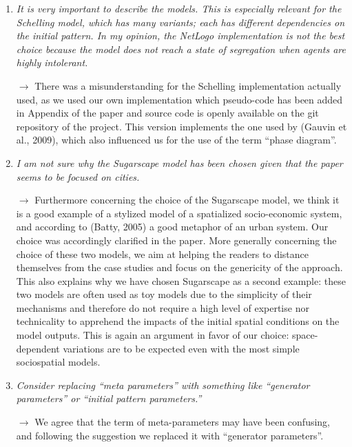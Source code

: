 \documentclass[11pt,a4paper,sans]{moderncv}        %
\begin{document}
\begin{enumerate}
	\item \textit{It is very important to describe the models. This is especially relevant for the Schelling model, which has many variants; each has different dependencies on the initial pattern. In my opinion, the NetLogo implementation is not the best choice because the model does not reach a state of segregation when agents are highly intolerant.}
	
	\medskip
	
	$\rightarrow$ There was a misunderstanding for the Schelling implementation actually used, as we used our own implementation which pseudo-code has been added in Appendix of the paper and source code is openly available on the git repository of the project. This version implements the one used by (Gauvin et al., 2009), which also influenced us for the use of the term ``phase diagram''.

	\bigskip
	
	
	\item \textit{I am not sure why the Sugarscape model has been chosen given that the paper seems to be focused on cities.}
	
	\medskip
	
	$\rightarrow$ Furthermore concerning the choice of the Sugarscape model, we think it is a good example of a stylized model of a spatialized socio-economic system, and according to (Batty, 2005) a good metaphor of an urban system. Our choice was accordingly clarified in the paper. More generally concerning the choice of these two models, we aim at helping the readers to distance themselves from the case studies and focus on the genericity of the approach. This also explains why we have chosen Sugarscape as a second example: these two models are often used as toy models due to the simplicity of their mechanisms and therefore do not require a high level of expertise nor technicality to apprehend the impacts of the initial spatial conditions on the model outputs. This is again an argument in favor of our choice: space-dependent variations are to be expected even with the most simple sociospatial models.
	\bigskip
	
	\item \textit{Consider replacing “meta parameters” with something like “generator parameters” or “initial pattern parameters.”}
	
	\medskip
	
	$\rightarrow$ We agree that the term of meta-parameters may have been confusing, and following the suggestion we replaced it with ``generator parameters''.
	\bigskip


\end{enumerate}
\end{document}
